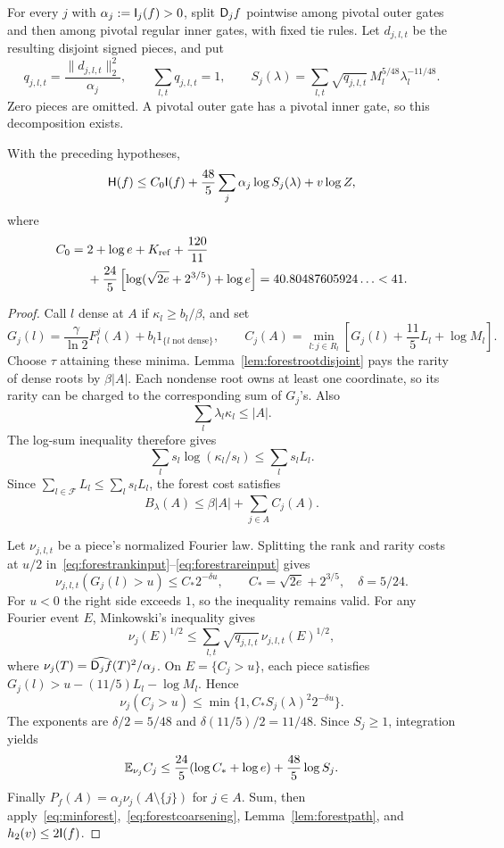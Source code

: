 For every $j$ with $\alpha_j:=\mathsf I_j(f)>0$, split $\mathsf D_jf$ pointwise among pivotal outer gates and then among pivotal regular inner gates, with fixed tie rules. Let $d_{j,l,t}$ be the resulting disjoint signed pieces, and put
\[
 q_{j,l,t}=\frac{\|d_{j,l,t}\|_2^2}{\alpha_j},\qquad
 \sum_{l,t}q_{j,l,t}=1,
 \qquad
 S_j(\lambda)=\sum_{l,t}\sqrt{q_{j,l,t}}\,
 M_l^{5/48}\lambda_l^{-11/48}.
\]
Zero pieces are omitted. A pivotal outer gate has a pivotal inner gate, so this decomposition exists.

\begin{theorem}\label{thm:fractionalforest}
With the preceding hypotheses,
\begin{equation}\label{eq:fractionalforest}
 \mathsf H(f)\le C_0\mathsf I(f)+\frac{48}{5}
       \sum_j\alpha_j\log S_j(\lambda)+v\log Z,
\end{equation}
where
\begin{align*}
 C_0={}&2+\log e+K_{\rm ref}+\frac{120}{11}\\
 &+\frac{24}{5}\left[\log(\sqrt{2e}+2^{3/5})+\log e\right]
 =40.80487605924\ldots<41.
\end{align*}
\end{theorem}
\begin{proof}
Call $l$ dense at $A$ if $\kappa_l\ge b_l/\beta$, and set
\[
 G_j(l)=\frac{\gamma}{\ln2}F_l^j(A)
       +b_l1_{\{l\text{ not dense}\}},\qquad
 C_j(A)=\min_{l:j\in R_l}\left[G_j(l)+\frac{11}{5}L_l+\log M_l\right].
\]
Choose $\tau$ attaining these minima. Lemma~\ref{lem:forestrootdisjoint} pays the rarity of dense roots by $\beta|A|$. Each nondense root owns at least one coordinate, so its rarity can be charged to the corresponding sum of $G_j$'s. Also
\[
 \sum_l\lambda_l\kappa_l\le|A|.
\]
The log-sum inequality therefore gives
\[
 \sum_l s_l\log(\kappa_l/s_l)\le\sum_l s_lL_l.
\]
Since $\sum_{l\in\mathcal F}L_l\le\sum_ls_lL_l$, the forest cost satisfies
\begin{equation}\label{eq:forestcoarsening}
 B_\lambda(A)\le\beta|A|+\sum_{j\in A}C_j(A).
\end{equation}

Let $\nu_{j,l,t}$ be a piece's normalized Fourier law. Splitting the rank and rarity costs at $u/2$ in~\eqref{eq:forestrankinput}--\eqref{eq:forestrareinput} gives
\[
 \nu_{j,l,t}(G_j(l)>u)\le C_*2^{-\delta u},\qquad
 C_*=\sqrt{2e}+2^{3/5},\quad\delta=5/24.
\]
For $u<0$ the right side exceeds $1$, so the inequality remains valid. For any Fourier event $E$, Minkowski's inequality gives
\[
 \nu_j(E)^{1/2}\le\sum_{l,t}\sqrt{q_{j,l,t}}\,
                                  \nu_{j,l,t}(E)^{1/2},
\]
where $\nu_j(T)=\widehat{\mathsf D_jf}(T)^2/\alpha_j$. On $E=\{C_j>u\}$, each piece satisfies $G_j(l)>u-(11/5)L_l-\log M_l$. Hence
\[
 \nu_j(C_j>u)\le\min\{1,C_*S_j(\lambda)^2 2^{-\delta u}\}.
\]
The exponents are $\delta/2=5/48$ and $\delta(11/5)/2=11/48$. Since $S_j\ge1$, integration yields
\[
 \mathbb E_{\nu_j}C_j\le\frac{24}{5}(\log C_*+\log e)
                       +\frac{48}{5}\log S_j.
\]
Finally $P_f(A)=\alpha_j\nu_j(A\setminus\{j\})$ for $j\in A$. Sum, then apply~\eqref{eq:minforest},~\eqref{eq:forestcoarsening}, Lemma~\ref{lem:forestpath}, and $h_2(v)\le2\mathsf I(f)$.
\end{proof}


